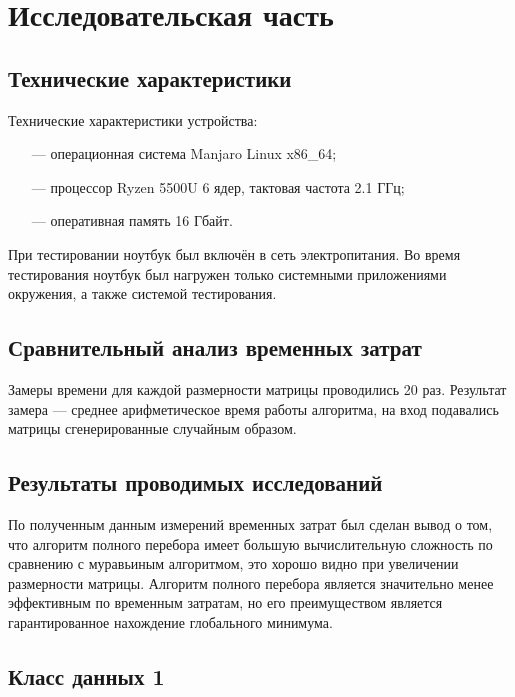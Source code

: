 \chapter{Исследовательская часть}

\section{Технические характеристики}

Технические характеристики устройства:

\begin{itemize}
	\item[---] операционная система Manjaro Linux x86\_64;
	\item[---] процессор Ryzen 5500U 6 ядер, тактовая частота 2.1 ГГц;
	\item[---] оперативная память 16 Гбайт.
\end{itemize}

При тестировании ноутбук был включён в сеть электропитания. Во время тестирования ноутбук был нагружен только системными приложениями окружения, а также системой тестирования.

\section{Сравнительный анализ временных затрат}

Замеры времени для каждой размерности матрицы проводились 20 раз. Результат замера --- среднее арифметическое время работы алгоритма, на вход подавались матрицы сгенерированные случайным образом.


\section{Результаты проводимых исследований}

По полученным данным измерений временных затрат был сделан вывод о том, что алгоритм полного перебора имеет большую вычислительную сложность по сравнению с муравьиным алгоритмом, это хорошо видно при увеличении размерности матрицы. Алгоритм полного перебора является значительно менее эффективным по временным затратам, но его преимуществом является гарантированное нахождение глобального минимума.


\section{Класс данных 1}

